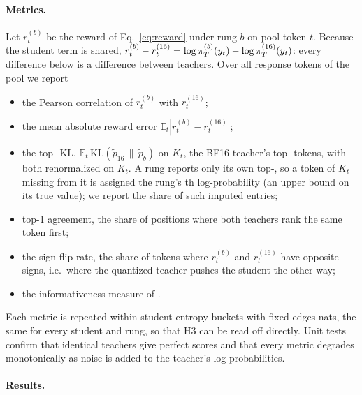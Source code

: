 \paragraph{Metrics.} Let $r_t^{(b)}$ be the reward of Eq.~\ref{eq:reward} under rung $b$ on
pool token $t$. Because the student term is shared, $r_t^{(b)}-r_t^{(16)}=\log\piT(y_t)-
\log\piT[16](y_t)$: every difference below is a difference between teachers. Over all response
tokens of the pool we report
\begin{itemize}
  \item the Pearson correlation of $r_t^{(b)}$ with $r_t^{(16)}$;
  \item the mean absolute reward error $\mathbb{E}_t|r_t^{(b)}-r_t^{(16)}|$;
  \item the top-\teacherTopK{} KL, $\mathbb{E}_t\,\mathrm{KL}(\tilde p_{16}\,\|\,\tilde p_b)$
        on $K_t$, the BF16 teacher's top-\teacherTopK{} tokens, with both renormalized on $K_t$.
        A rung reports only its own top-\teacherTopK{}, so a token of $K_t$ missing from it is
        assigned the rung's \teacherTopK{}th log-probability (an upper bound on its true value);
        we report the share of such imputed entries;
  \item top-1 agreement, the share of positions where both teachers rank the same token first;
  \item the sign-flip rate, the share of tokens where $r_t^{(b)}$ and $r_t^{(16)}$ have opposite
        signs, i.e.\ where the quantized teacher pushes the student the other way;
  \item the informativeness measure of \citet{understandingopd2026}
        .
\end{itemize}
Each metric is repeated within student-entropy buckets with fixed edges
\entropyBuckets{} nats, the same for every student and rung, so
that H3 can be read off directly. Unit tests confirm that identical teachers give perfect scores
and that every metric degrades monotonically as noise is added to the teacher's log-probabilities.




\paragraph{Results.} \TBD{} 
